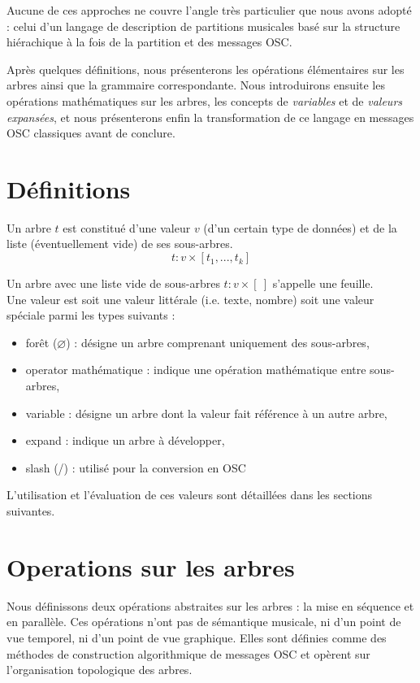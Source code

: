 \documentclass{article}
\newcommand{\llist}	[1]		{\ensuremath{[#1_1,...,#1_k]}}
\newcommand{\forest}	{\ensuremath{\varnothing}}
\newcommand{\emptyf}	{\ensuremath{[\ ]}}
\begin{document}
Aucune de ces approches ne couvre l'angle très particulier que nous avons adopté : celui d'un langage de description de partitions musicales basé sur la structure hiérachique à la fois de la partition et des messages OSC.

Après quelques définitions, nous présenterons les opérations élémentaires sur les arbres ainsi que la grammaire correspondante. Nous introduirons ensuite les opérations mathématiques sur les arbres, les concepts de \emph{variables} et de \emph{valeurs expansées}, et nous présenterons enfin la transformation de ce langage en messages OSC classiques avant de conclure.



\section{Définitions}

Un arbre $t$ est constitué d'une valeur $v$ (d'un certain type de données) et de la liste (éventuellement vide) de ses sous-arbres.
\[
	t :  v \times \llist{t} 
\]

Un arbre avec une liste vide de sous-arbres $t:v\times \emptyf$ s'appelle une feuille. \\
Une valeur est soit une valeur littérale (i.e. texte, nombre) soit une valeur spéciale parmi les types suivants :
\begin{itemize}
\item forêt (\forest) : désigne un arbre comprenant uniquement des sous-arbres,
\item operator mathématique : indique une opération mathématique entre sous-arbres,
\item variable : désigne un arbre dont la valeur fait référence à un autre arbre, 
\item expand : indique un arbre à développer,
\item slash (/) : utilisé pour la conversion en OSC
\end{itemize}
L'utilisation et l'évaluation de ces valeurs sont détaillées dans les sections suivantes.


\section{Operations sur les arbres}

Nous définissons deux opérations abstraites sur les arbres : la mise en séquence et en parallèle. Ces opérations n'ont pas de sémantique musicale, ni d'un point de vue temporel, ni d'un point de vue graphique. Elles sont définies comme des méthodes de construction algorithmique de messages OSC et opèrent sur l'organisation topologique des arbres. 
\end{document}

